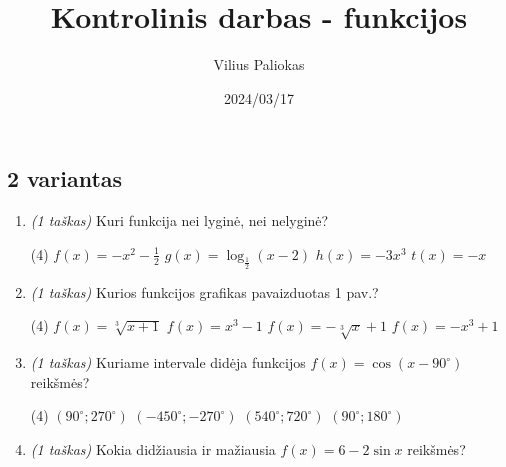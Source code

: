 \documentclass[a4paper]{article}
\title{Kontrolinis darbas - funkcijos}
\author{Vilius Paliokas}
\date{2024/03/17}
\begin{document}
\thispagestyle{fancy}

\titlespacing*{\subsection}{0pt}{.75ex}{0.75ex}

\subsection*{2 variantas}

\begin{enumerate}
      \item \textit{(1 taškas)} Kuri funkcija nei lyginė, nei nelyginė?
            \begin{tasks}[item-format={\normalfont}, after-item-skip=2mm,
                        label=\Alph*, label-format={\bfseries}](4)
                  \task $f(x)=-x^2-\frac{1}{2}$
                  \task $g(x)=\log_{\frac{1}{2}}({x-2})$
                  \task $h(x)=-3x^3$
                  \task $t(x)=-x$
            \end{tasks}

      \item \textit{(1 taškas)} Kurios funkcijos grafikas pavaizduotas 1 pav.?
            \begin{tasks}[item-format={\normalfont}, after-item-skip=2mm,
                        label=\Alph*, label-format={\bfseries}](4)
                  \task $f(x)=\sqrt[3]{x+1}$
                  \task $f(x)=x^3-1$
                  \task $f(x)=-\sqrt[3]{x}+1$
                  \task $f(x)=-x^3+1$
            \end{tasks}

      \item \textit{(1 taškas)} Kuriame intervale didėja funkcijos
            $f(x)=\cos(x-90^\circ)$ reikšmės?
            \begin{tasks}[item-format={\normalfont}, after-item-skip=2mm,
                        label=\Alph*, label-format={\bfseries}](4)
                  \task $(90^\circ; 270^\circ)$
                  \task $(-450^\circ; -270^\circ)$
                  \task $(540^\circ; 720^\circ)$
                  \task $(90^\circ; 180^\circ)$
            \end{tasks}

      \item \textit{(1 taškas)} Kokia didžiausia ir mažiausia $f(x)=6-2\sin{x}$
            reikšmės?
            \vspace{7mm}


\end{enumerate}
\end{document}
